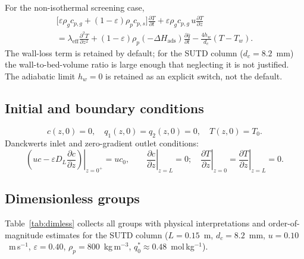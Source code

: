 \documentclass[a4paper]{amsart}
\theoremstyle{definition}
\begin{document}
For the non-isothermal screening case,
\begin{multline}
  \bigl[\varepsilon\rho_g c_{p,g}+(1-\varepsilon)\rho_p c_{p,s}\bigr]
  \frac{\partial T}{\partial t}
  + \varepsilon\rho_g c_{p,g}\,u\frac{\partial T}{\partial z}
  \\
  = \lambda_\text{eff}\frac{\partial^2 T}{\partial z^2}
    + (1-\varepsilon)\rho_p(-\Delta H_\text{ads})\frac{\partial\bar{q}}{\partial t}
    - \frac{4h_w}{d_c}(T-T_w).
  \label{eq:energy}
\end{multline}
The wall-loss term is retained by default; for the SUTD column
($d_c=8.2$~mm) the wall-to-bed-volume ratio is large enough that
neglecting it is not justified.  The adiabatic limit $h_w=0$ is
retained as an explicit switch, not the default.

\subsection{Initial and boundary conditions}

\begin{equation}
  c(z,0)=0,\quad q_1(z,0)=q_2(z,0)=0,\quad T(z,0)=T_0.
  \label{eq:IC}
\end{equation}
Danckwerts inlet and zero-gradient outlet conditions:
\begin{equation}
  \left.\!\left(uc - \varepsilon D_L\frac{\partial c}{\partial z}\right)\right|_{z=0^+}
    \!=uc_0,\qquad
  \left.\frac{\partial c}{\partial z}\right|_{z=L}=0;\quad
  \left.\frac{\partial T}{\partial z}\right|_{z=0}
    =\left.\frac{\partial T}{\partial z}\right|_{z=L}=0.
  \label{eq:BC}
\end{equation}

\subsection{Dimensionless groups}
\label{sec:dimless}

Table~\ref{tab:dimless} collects all groups with physical interpretations and
order-of-magnitude estimates for the SUTD column
($L=0.15$~m, $d_c=8.2$~mm, $u=0.10$~m\,s$^{-1}$,
$\varepsilon=0.40$, $\rho_p=800$~kg\,m$^{-3}$, $q_0^*\approx0.48$~mol\,kg$^{-1}$).
\end{document}
